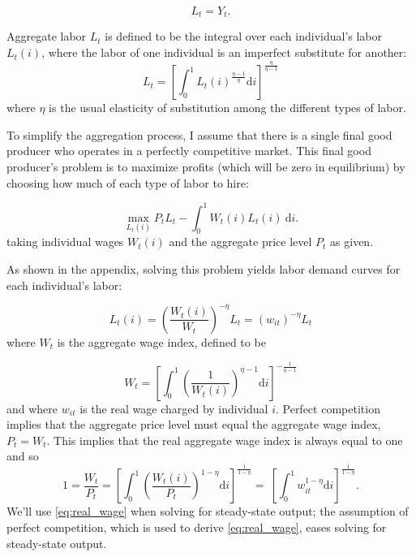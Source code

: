 \documentclass[12pt,a4paper]{scrartcl}            %
\begin{document}
\begin{equation} \label{eq:agg_output}
    L_t = Y_t.
\end{equation}

Aggregate labor \(L_t\) is defined to be the integral over each individual's labor \(L_t(i)\), where the labor of one individual is an imperfect substitute for another:
%
\begin{equation} \label{eq:agg_labor}
    L_t = \left[ \int_0^1 L_t(i)^{\frac{\eta - 1}{\eta}} \mathrm{d}i \right]^{\frac{\eta}{\eta - 1}}
\end{equation}
%
where $\eta$ is the usual elasticity of substitution among the different types of labor.

To simplify the aggregation process, I assume that there is a single final good producer who operates in a perfectly competitive market.
This final good producer's problem is to maximize profits (which will be zero in equilibrium) by choosing how much of each type of labor to hire:

\begin{equation} \label{eq:firms_problem}
    \max_{L_t(i)} P_t L_t - \int_0^1 \! W_t(i)L_t(i) \ \mathrm{d}i.
\end{equation}
%
taking individual wages $W_t(i)$ and the aggregate price level $P_t$ as given.

As shown in the appendix, solving this problem yields labor demand curves for each individual's labor:

\begin{equation}
    \label{eq:labor_demand}
    L_t(i) = \left( \frac{W_t(i)}{W_t} \right)^{-\eta}L_t = (w_{it})^{-\eta}L_t
\end{equation}
%
where $W_t$ is the aggregate wage index, defined to be

\begin{equation} \label{eq:wage_index}
    W_t = \left[\int_{0}^{1}\left(\frac{1}{W_t(i)}\right)^{\eta - 1} \mathrm{d}i \right]^{-\frac{1}{\eta - 1}}
\end{equation}
%
and where $w_{it}$ is the real wage charged by individual $i$.
Perfect competition implies that the aggregate price level must equal the aggregate wage index, $P_t = W_t$.  This implies that the real aggregate wage index is always equal to one and so
%
\begin{equation} \label{eq:real_wage}
    1 = \frac{W_t}{P_t} = \left[\int_{0}^{1} \left( \frac{W_t(i)}{P_t} \right)^{1 - \eta} \mathrm{d}i \right]^{\frac{1}{1 - \eta} }\!\!\!\! = \ \left[\int_{0}^{1} \! w_{it}^{1 - \eta} \mathrm{d}i \right]^{ \frac{1}{1 - \eta} }.
\end{equation}
%
We'll use \eqref{eq:real_wage} when solving for steady-state output;  the assumption of perfect competition, which is used to derive \eqref{eq:real_wage}, eases solving for steady-state output.
\end{document}
